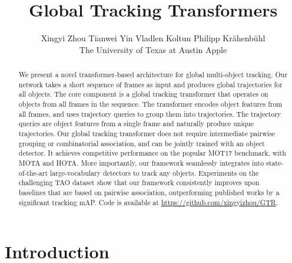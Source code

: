 \documentclass[10pt,twocolumn,letterpaper]{article}
\begin{document}
\title{Global Tracking Transformers}

\author{
  Xingyi Zhou \quad Tianwei Yin \quad Vladlen Koltun \quad Philipp Kr{\"a}henb{\"u}hl\\
{The University of Texas at Austin \quad \quad Apple}
}

\maketitle

\begin{abstract}
We present a novel transformer-based architecture for global multi-object tracking. Our network takes a short sequence of frames as input and produces global trajectories for all objects. The core component is a global tracking transformer that operates on objects from all frames in the sequence. The transformer encodes object features from all frames, and uses trajectory queries to group them into trajectories. The trajectory queries are object features from a single frame and naturally produce unique trajectories. Our global tracking transformer does not require intermediate pairwise grouping or combinatorial association, and can be jointly trained with an object detector. It achieves competitive performance on the popular MOT17 benchmark, with  MOTA and  HOTA. More importantly, our framework seamlessly integrates into state-of-the-art large-vocabulary detectors to track any objects. Experiments on the challenging TAO dataset show that our framework consistently improves upon baselines that are based on pairwise association, outperforming published works by a significant  tracking mAP. Code is available at \url{https://github.com/xingyizhou/GTR}.
\end{abstract}

\section{Introduction}
\end{document}
